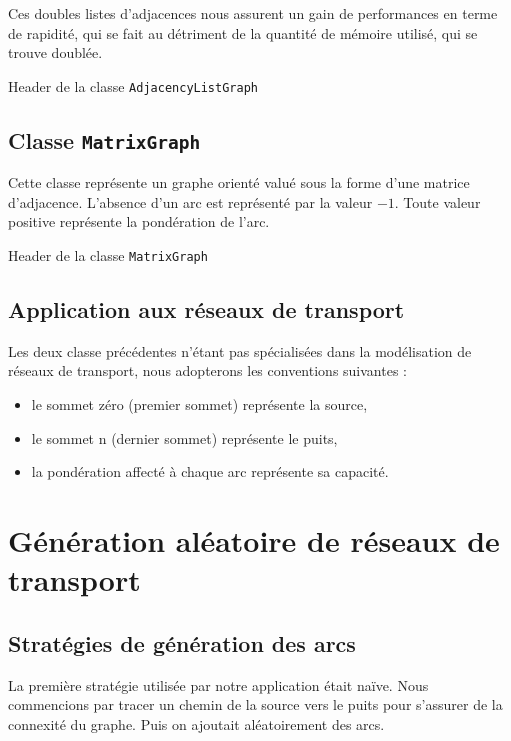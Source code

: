 Ces doubles listes d'adjacences nous assurent un gain de performances en terme de rapidité, qui se fait au détriment de la quantité de mémoire utilisé, qui se trouve doublée.

Header de la classe \texttt{AdjacencyListGraph}




\subsection{Classe \texttt{MatrixGraph}}

Cette classe représente un graphe orienté valué sous la forme d'une matrice d'adjacence. L'absence d'un arc est représenté par la valeur $-1$. Toute valeur positive représente la pondération de l'arc.

Header de la classe \texttt{MatrixGraph}



\subsection{Application aux réseaux de transport}
Les deux classe précédentes n'étant pas spécialisées dans la modélisation de réseaux de transport, nous adopterons les conventions suivantes :
\begin{itemize}
\item le sommet zéro (premier sommet) représente la source,
\item le sommet n (dernier sommet) représente le puits,
\item la pondération affecté à chaque arc représente sa capacité.
\end{itemize}


\section{Génération aléatoire de réseaux de transport}

\subsection{Stratégies de génération des arcs}

La première stratégie utilisée par notre application était naïve. Nous commencions par tracer un chemin de la source vers le puits pour s'assurer de la connexité du graphe. Puis on ajoutait aléatoirement des arcs.

